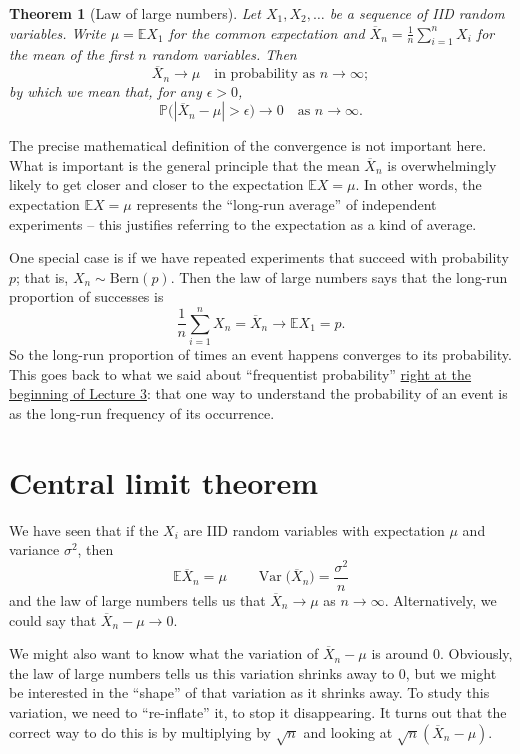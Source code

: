 \documentclass[
  a4paper,
]{book}
\newtheorem{theorem}{Theorem}[chapter]
\theoremstyle{definition}
\theoremstyle{definition}
\theoremstyle{definition}
\theoremstyle{definition}
\theoremstyle{remark}
\begin{document}
\begin{theorem}[Law of large numbers]
\protect\hypertarget{thm:thLLN}{}\label{thm:thLLN}Let \(X_1, X_2, \dots\) be a sequence of IID random variables. Write \(\mu = \mathbb EX_1\) for the common expectation and \(\overline X_n =\frac{1}{n} \sum_{i=1}^n X_i\) for the mean of the first \(n\) random variables. Then
\[ \overline X_n \to \mu \quad \text{in probability as $n \to \infty$}; \]
by which we mean that, for any \(\epsilon > 0\),
\[ \mathbb P\big(|\overline X_n - \mu| > \epsilon\big) \to 0 \quad \text{as $n\to\infty$.} \]
\end{theorem}

The precise mathematical definition of the convergence is not important here. What is important is the general principle that the mean \(\overline X_n\) is overwhelmingly likely to get closer and closer to the expectation \(\mathbb EX = \mu\). In other words, the expectation \(\mathbb EX = \mu\) represents the ``long-run average'' of independent experiments -- this justifies referring to the expectation as a kind of average.

One special case is if we have repeated experiments that succeed with probability \(p\); that is, \(X_n \sim \text{Bern}(p)\). Then the law of large numbers says that the long-run proportion of successes is
\[ \frac{1}{n} \sum_{i = 1}^n X_n = \overline X_n \to \mathbb EX_1 = p . \]
So the long-run proportion of times an event happens converges to its probability. This goes back to what we said about ``frequentist probability'' \protect\hyperlink{what-is-prob}{right at the beginning of Lecture 3}: that one way to understand the probability of an event is as the long-run frequency of its occurrence.

\hypertarget{clt}{%
\section{Central limit theorem}\label{clt}}

We have seen that if the \(X_i\) are IID random variables with expectation \(\mu\) and variance \(\sigma^2\), then
\[ \mathbb E\overline X_n = \mu \qquad \operatorname{Var}\big(\overline X_n\big) = \frac{\sigma^2}{n} \]
and the law of large numbers tells us that \(\overline X_n \to \mu\) as \(n \to \infty\). Alternatively, we could say that \(\overline X_n - \mu \to 0\).

We might also want to know what the variation of \(\overline X_n - \mu\) is around 0. Obviously, the law of large numbers tells us this variation shrinks away to 0, but we might be interested in the ``shape'' of that variation as it shrinks away. To study this variation, we need to ``re-inflate'' it, to stop it disappearing. It turns out that the correct way to do this is by multiplying by \(\sqrt{n}\) and looking at \(\sqrt{n}(\overline X_n - \mu)\).
\end{document}
